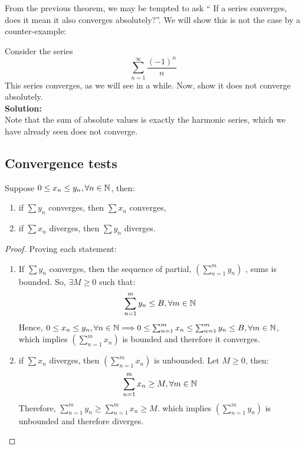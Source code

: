 From the previous theorem, we may be tempted to ask `` If a series converges, does it mean it also converges absolutely?''. We will show this is not the case by a counter-example:

\begin{eg}
    Consider the series
    \begin{equation*}
        \sum \limits_{n=1}^\infty \frac{(-1)^n}{n}
    \end{equation*}
    This series converges, as we will see in a while. Now, show it does not converge absolutely.\\
    \textbf{Solution:}\\
    Note that the sum of absolute values is exactly the harmonic series, which we have already seen does not converge. 
\end{eg}

\subsection{Convergence tests}

\begin{theorem}
    Suppose $0 \leq x_n \leq y_n, \forall n \in \mathbb{N}$, then:
    \begin{enumerate}
        \item if $\sum y_n$ converges, then $\sum x_n$ converges,
        \item if $\sum x_n$ diverges, then $\sum y_n$ diverges.
    \end{enumerate}
\end{theorem}

\begin{proof}
    Proving each statement:
    \begin{enumerate}
        \item If $\sum y_n$ converges, then the sequence of partial, $(\sum_{n=1}^m y_n)$ , sums is bounded. So, $\exists M \geq 0$ such that:
        \begin{equation}
            \sum \limits_{n=1}^m y_n \leq B, \forall m \in \mathbb{N}
        \end{equation}
        Hence, $0 \leq x_n \leq y_n, \forall n \in \mathbb{N} \Longrightarrow 0 \leq \sum_{n=1}^m x_n \leq \sum_{n=1}^m y_n \leq B, \forall m \in \mathbb{N}$, which implies $(\sum_{n=1}^m x_n)$ is bounded and therefore it converges.
        \item if $\sum x_n$ diverges, then $(\sum_{n=1}^m x_n)$ is unbounded. Let $M \geq 0$, then:
        \begin{equation}
            \sum \limits_{n=1}^m x_n \geq M, \forall m \in \mathbb{N}
        \end{equation}
        Therefore, $\sum_{n=1}^m y_n \geq \sum_{n=1}^m x_n \geq M$. which implies $(\sum_{n=1}^m y_n)$ is unbounded and therefore diverges.
    \end{enumerate}
\end{proof}

